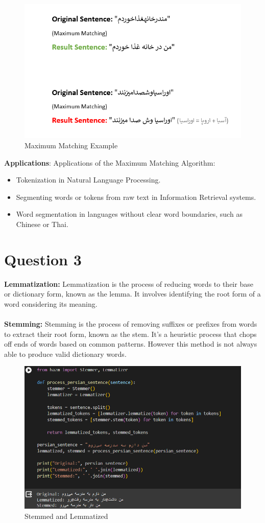\documentclass{article}
\begin{document}
\begin{figure}[h]
  \centering
  \includegraphics[width=1\textwidth]{Images/MaxMatch.png}
  \caption{Maximum Matching Example}
  \label{fig:model_diagram}
\end{figure}

\textbf{Applications}: Applications of the Maximum Matching Algorithm:
\begin{itemize}
  \item Tokenization in Natural Language Processing.
  \item Segmenting words or tokens from raw text in Information Retrieval systems.
  \item Word segmentation in languages without clear word boundaries, such as Chinese or Thai.
\end{itemize}

\pagebreak

\section*{Question 3}
\textbf{Lemmatization:} Lemmatization is the process of reducing words to their base or dictionary form, known as the lemma. It involves identifying the root form of a word considering its meaning. \\\\
\textbf{Stemming:} Stemming is the process of removing suffixes or prefixes from words to extract their root form, known as the stem. It's a heuristic process that chops off ends of words based on common patterns. However this method is not always able to produce valid dictionary words.

\begin{figure}[h]
  \centering
  \includegraphics[width=1\textwidth]{Images/Stem_Lemma.png}
  \caption{Stemmed and Lemmatized}
  \label{fig:model_diagram}
\end{figure}
\end{document}
